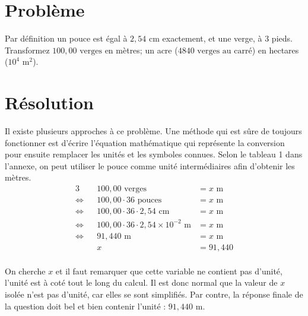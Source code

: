 \documentclass[11pt]{article}
\begin{document}
\section*{Problème}
Par définition un pouce est égal à $2,54\text{ cm}$ exactement, et une verge, à 3 pieds. Transformez $100,00\text{ verges}$ en mètres; un acre ($4840\text{ verges au carré}$) en hectares ($10^4\text{ m}^2$). \cite{problem}

\section*{Résolution}
Il existe plusieurs approches à ce problème. Une méthode qui est sûre de toujours fonctionner est d'écrire l'équation mathématique qui représente la conversion pour ensuite remplacer les unités et les symboles connues. Selon le tableau 1 dans l'annexe, on peut utiliser le pouce comme unité intermédiaires afin d'obtenir les mètres.
\begin{alignat*}{3}
                & &                           100,00\text{ verges}&=x\text{ m}\\
\Leftrightarrow & &                    100,00\cdot36\text{ pouces}&=x\text{ m}\\
\Leftrightarrow & &               100,00\cdot36\cdot2,54\text{ cm}&=x\text{ m}\\
\Leftrightarrow & &   100,00\cdot36\cdot2,54\times10^{-2}\text{ m}&=x\text{ m}\\
\Leftrightarrow & &                                91,440\text{ m}&=x\text{ m}\\
                & &                                              x&=91,440\\
\end{alignat*}

On cherche $x$ et il faut remarquer que cette variable ne contient pas d'unité, l'unité est à coté tout le long du calcul. Il est donc normal que la valeur de $x$ isolée n'est pas d'unité, car elles se sont simplifiés. Par contre, la réponse finale de la question doit bel et bien contenir l'unité : $91,440$ m.\\
\end{document}
